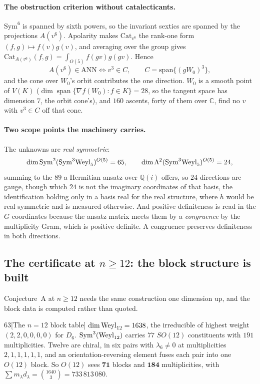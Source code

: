 \paragraph{The obstruction criterion without catalecticants.} $\mathrm{Sym}^6$ is spanned by sixth powers, so the invariant sextics are spanned by the projections $A(v^6)$. Apolarity makes $\mathrm{Cat}_{v^6}$ the rank-one form $(f,g)\mapsto f(v)g(v)$, and averaging over the group gives $\mathrm{Cat}_{A(v^6)}(f,g)=\int_{O(5)}f(gv)g(gv)$. Hence
\[
A(v^6)\in\mathrm{ANN}\iff v^3\in C,\qquad C=\mathrm{span}\{(gW_0)^3\},
\]
and the cone over $W_0$'s orbit contributes the one direction. $W_0$ is a smooth point of $V(K)$ ($\dim\operatorname{span}\{\nabla f(W_0):f\in K\}=28$, so the tangent space has dimension $7$, the orbit cone's), and $160$ ascents, forty of them over $\mathbb C$, find no $v$ with $v^3\in C$ off that cone.

\paragraph{Two scope points the machinery carries.} The unknowns are \emph{real symmetric}:
\[
\dim\mathrm{Sym}^2(\mathrm{Sym}^3\mathrm{Weyl}_5)^{O(5)}=65,\qquad \dim\Lambda^2(\mathrm{Sym}^3\mathrm{Weyl}_5)^{O(5)}=24,
\]
summing to the $89$ a Hermitian ansatz over $\mathbb Q(i)$ offers, so $24$ directions are gauge, though which $24$ is not the imaginary coordinates of that basis, the identification holding only in a basis real for the real structure, where $h$ would be real symmetric and is measured otherwise. And positive definiteness is read in the $G$ coordinates because the ansatz matrix meets them by a \emph{congruence} by the multiplicity Gram, which is positive definite. A congruence preserves definiteness in both directions.

\subsection{The certificate at $n\ge12$: the block structure is built}\label{sec:sos12}

Conjecture~A at $n\ge12$ needs the same construction one dimension up, and the block data is computed rather than quoted.

\begin{Lem}{63}[The $n=12$ block table]
$\dim\mathrm{Weyl}_{12}=1638$, the irreducible of highest weight $(2,2,0,0,0,0)$ for $D_6$. $\mathrm{Sym}^3(\mathrm{Weyl}_{12})$ carries $77$ $SO(12)$ constituents with $191$ multiplicities. Twelve are chiral, in six pairs with $\lambda_6\ne0$ at multiplicities $2,1,1,1,1,1$, and an orientation-reversing element fuses each pair into one $O(12)$ block. So $O(12)$ sees $\mathbf{71}$ blocks and $\mathbf{184}$ multiplicities, with $\sum m_\lambda d_\lambda=\binom{1640}3=733\,813\,080$.
\end{Lem}

